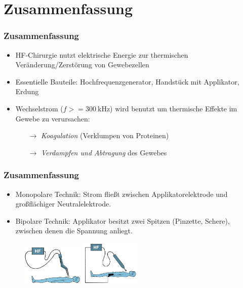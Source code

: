 \documentclass{beamer}
\begin{document}
\section{Zusammenfassung}
\begin{frame}
\frametitle{Zusammenfassung}
	\begin{itemize}
		\item HF-Chirurgie nutzt elektrische Energie zur thermischen Veränderung/Zerstörung von Gewebezellen
		\item Essentielle Bauteile: Hochfrequenzgenerator, Handstück mit Applikator, Erdung
		\item Wechselstrom ($f>=\SI{300}{\kilo\hertz}$) wird benutzt um thermische Effekte im Gewebe zu verursachen:
		\begin{itemize}
			\item [$\rightarrow$] \emph{Koagulation} (Verklumpen von Proteinen)
			\item [$\rightarrow$] \emph{Verdampfen und Abtragung} des Gewebes
		\end{itemize}
	\end{itemize}
\end{frame}


\begin{frame}
\frametitle{Zusammenfassung}
	\begin{itemize}
		\item Monopolare Technik: Strom fließt zwischen Applikatorelektrode und großflächiger Neutralelektrode.
		\item Bipolare Technik:	Applikator besitzt zwei Spitzen (Pinzette, Schere), zwischen denen die Spannung anliegt.
	\end{itemize}
	\begin{figure}
	\includegraphics[width=3cm]{images/bipolareTechnik.png}
	\hspace{1cm}
	\includegraphics[width=2.8cm]{images/monopolareTechnik.png}
	\end{figure}
\end{frame}
\end{document}
